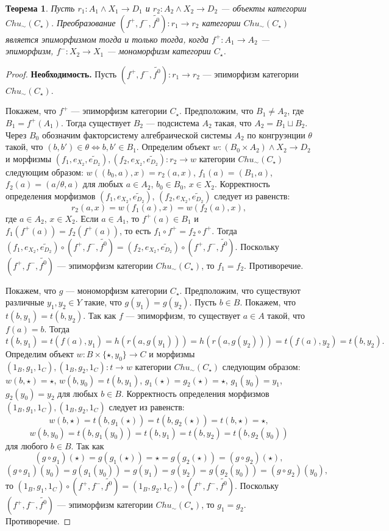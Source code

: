 \documentclass[a4paper,12pt]{article}
\newtheorem{theorem}{Теорема}
\newcommand{\fo}{\widetilde{f^0}}
\begin{document}
\begin{theorem}\label{epimorphism-c}
    Пусть $r_1: A_1 \wedge X_1 \to D_1$ и $r_2: A_2 \wedge X_2 \to D_2$ --- объекты категории $Chu_\sim(C_\star)$. Преобразование $(f^+,f^-,\fo): r_1 \to r_2$ категории $Chu_\sim(C_\star)$ является эпиморфизмом тогда и только тогда, когда $f^+: A_1 \to A_2$ --- эпиморфизм, $f^-: X_2 \to X_1$ --- мономорфизм категории $C_{\star}$.
\end{theorem}
\begin{proof}
    \textbf{Необходимость.} Пусть $(f^+,f^-,\fo): r_1 \to r_2$ --- эпиморфизм категории $Chu_\sim(C_\star)$.

    Покажем, что $f^+$ --- эпиморфизм категории $C_\star$. Предположим, что $B_1 \ne A_2$, где $B_1 = f^+(A_1)$. Тогда существует $B_2$ --- подсистема $A_2$ такая, что $A_2 = B_1 \sqcup B_2$. Через $B_0$ обозначим факторсистему алгебраической системы $A_2$ по конгруэнции $\theta$ такой, что $(b,b') \in \theta \Leftrightarrow b, b' \in B_1$. Определим объект $w: (B_0 \times A_2) \wedge X_2 \to D_2$ и морфизмы $(f_1,e_{X_2},\widetilde{e_{D_2}}), (f_2,e_{X_2},\widetilde{e_{D_2}}): r_2 \to w$ категории $Chu_\sim(C_\star)$ следующим образом: $w((b_0,a),x) = r_2(a,x)$, $f_1(a) = (B_1,a)$, $f_2(a) = (a/\theta,a)$ для любых $a \in A_2$, $b_0 \in B_0$, $x \in X_2$. Корректность определения морфизмов $(f_1,e_{X_2},\widetilde{e_{D_2}})$, $(f_2,e_{X_2},\widetilde{e_{D_2}})$ следует из равенств:
    $$
        r_2(a,x) = w(f_1(a),x) = w(f_2(a),x),
    $$
    где $a \in A_2$, $x \in X_2$. Если $a \in A_1$, то $f^+(a) \in B_1$ и $f_1(f^+(a)) = f_2(f^+(a))$, то есть $f_1 \circ f^+ = f_2 \circ f^+$. Тогда $(f_1,e_{X_2},\widetilde{e_{D_2}}) \circ (f^+,f^-,\fo) = (f_2,e_{X_2},\widetilde{e_{D_2}}) \circ (f^+,f^-,\fo)$. Поскольку $(f^+,f^-,\fo)$ --- эпиморфизм категории $Chu_\sim(C_\star)$, то $f_1 = f_2$. Противоречие.

    Покажем, что $g$ --- мономорфизм категории $C_\star$. Предположим, что существуют различные $y_1, y_2 \in Y$ такие, что $g(y_1) = g(y_2)$. Пусть $b \in B$. Покажем, что $t(b,y_1) = t(b,y_2)$. Так как $f$ --- эпиморфизм, то существует $a \in A$ такой, что $f(a) = b$. Тогда
    $$
        t(b,y_1) = t(f(a),y_1) = h(r(a,g(y_1))) = h(r(a,g(y_2))) = t(f(a),y_2) = t(b,y_2).
    $$
    Определим объект $w: B \times \{\star,y_0\} \to C$ и морфизмы $(1_B,g_1,1_C), (1_B,g_2,1_C): t \to w$ категории $Chu_\sim(C_\star)$ следующим образом: $w(b,\star) = \star$, $w(b,y_0) = t(b,y_1)$, $g_1(\star) = g_2(\star) = \star$, $g_1(y_0) = y_1$, $g_2(y_0) = y_2$ для любых $b \in B$. Корректность определения морфизмов $(1_B,g_1,1_C), (1_B,g_2,1_C)$ следует из равенств:
    $$
        w(b,\star) = t(b,g_1(\star)) = t(b,g_2(\star)) = t(b,\star) = \star,
    $$
    $$
        w(b,y_0) = t(b,g_1(y_0)) = t(b,y_1) = t(b,y_2) = t(b,g_2(y_0))
    $$
    для любого $b \in B$. Так как
    $$
        (g \circ g_1)(\star) = g(g_1(\star)) = \star = g(g_2(\star)) = (g \circ g_2)(\star),
    $$
    $$
        (g \circ g_1)(y_0) = g(g_1(y_0)) = g(y_1) = g(y_2) = g(g_2(y_0)) = (g \circ g_2)(y_0),
    $$
    то $(1_B,g_1,1_C) \circ (f^+,f^-,\fo) = (1_B,g_2,1_C) \circ (f^+,f^-,\fo)$. Поскольку $(f^+,f^-,\fo)$ --- эпиморфизм категории $Chu_\sim(C_\star)$, то $g_1 = g_2$. Противоречие.


\end{proof}
\end{document}
